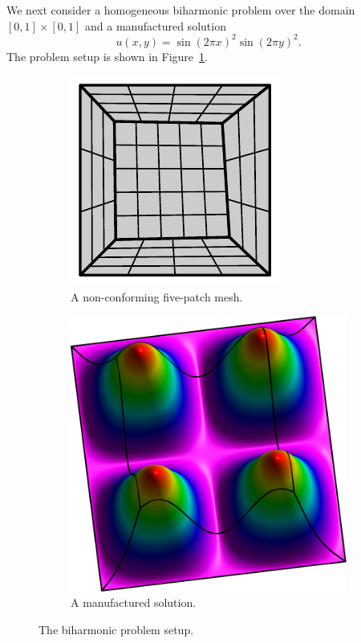 We next consider a homogeneous biharmonic problem over the domain $\left[0, 1\right]\times \left[0, 1\right]$ and a manufactured solution
\begin{equation}
	u(x,y)=\sin(2\pi{x})^2\sin(2\pi{y})^2.
\end{equation}
The problem setup is shown in Figure~\ref{fig:biharmonic_mesh}.
\begin{figure}[ht]
	\center
	\begin{subfigure}[t]{.45\linewidth}
		\center
		\includegraphics[scale=1.35]{five_patches_mesh}
		\caption{A non-conforming five-patch mesh.}
	\end{subfigure}
	\begin{subfigure}[t]{.45\linewidth}
		\center
		\includegraphics[scale=.425]{five_patch_solution-plot}
		\caption{A manufactured solution.}
	\end{subfigure}
	\caption{The biharmonic problem setup.}\label{fig:biharmonic_mesh}
\end{figure}

